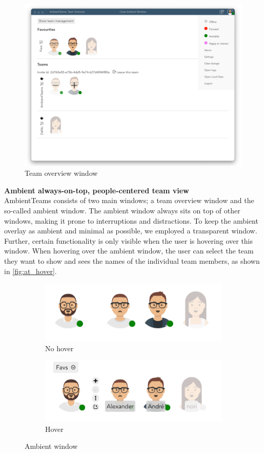 \begin{figure}[h]
    \centering
    \includegraphics[width=.8\linewidth]{./images/AT_overview.png}
    \caption{Team overview window }
    \label{fig:at_overview}
\end{figure}

\medskip\noindent\textbf{Ambient always-on-top, people-centered team view} \\
AmbientTeams consists of two main windows; a team overview window and the so-called ambient window. The ambient window always sits on top of other windows, making it prone to interruptions and distractions. To keep the ambient overlay as ambient and minimal as possible, we employed a transparent window. Further, certain functionality is only visible when the user is hovering over this window. When hovering over the ambient window, the user can select the team they want to show and sees the names of the individual team members, as shown in \autoref{fig:at_hover}.

\begin{figure}[h]
    \centering
    \begin{subfigure}{.5\textwidth}
        \centering
        \includegraphics[width=.8\linewidth]{./images/AT_no_hover.png}
        \caption{No hover }
        \label{fig:at_no_hover}
    \end{subfigure}%
    \begin{subfigure}{.5\textwidth}
        \centering
        \includegraphics[width=.8\linewidth]{./images/AT_hover.png}
        \caption{Hover }
        \label{fig:at_hover}
    \end{subfigure}
    \caption{Ambient window}
\end{figure}

